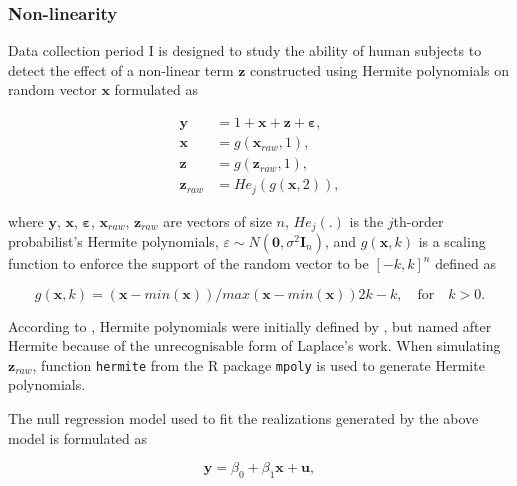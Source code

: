 \documentclass[]{interact}
\theoremstyle{plain}%
\theoremstyle{definition}
\theoremstyle{remark}
\begin{document}
\hypertarget{non-linearity}{%
\subsubsection{Non-linearity}\label{non-linearity}}

Data collection period I is designed to study the ability of human
subjects to detect the effect of a non-linear term \(\boldsymbol{z}\)
constructed using Hermite polynomials on random vector
\(\boldsymbol{x}\) formulated as

\begin{align} \label{eq:nonlinearity-model}
\boldsymbol{y} &= 1 + \boldsymbol{x} + \boldsymbol{z} + \boldsymbol{\varepsilon},\\
\boldsymbol{x} &= g(\boldsymbol{x}_{raw}, 1), \\
\boldsymbol{z} &= g(\boldsymbol{z}_{raw}, 1), \\
\boldsymbol{z}_{raw} &= He_j(g(\boldsymbol{x}, 2)),
\end{align}

\noindent where \(\boldsymbol{y}\), \(\boldsymbol{x}\),
\(\boldsymbol{\varepsilon}\), \(\boldsymbol{x}_{raw}\),
\(\boldsymbol{z}_{raw}\) are vectors of size \(n\), \(He_{j}(.)\) is the
\(j\)th-order probabilist's Hermite polynomials,
\(\varepsilon \sim N(\boldsymbol{0}, \sigma^2\boldsymbol{I}_n)\), and
\(g(\boldsymbol{x}, k)\) is a scaling function to enforce the support of
the random vector to be \([-k, k]^n\) defined as

\begin{equation} \label{eq:scaling-function}
g(\boldsymbol{x}, k) = (\boldsymbol{x} - min(\boldsymbol{x}))/max(\boldsymbol{x} - min(\boldsymbol{x}))2k - k, \quad \text{for} \quad k > 0. 
\end{equation}

According to \citet{abramowitz1964handbook}, Hermite polynomials were
initially defined by \citet{de1820theorie}, but named after Hermite
\citep{hermite1864nouveau} because of the unrecognisable form of
Laplace's work. When simulating \(\boldsymbol{z}_{raw}\), function
\texttt{hermite} from the R package \texttt{mpoly} \citep{mpoly} is used
to generate Hermite polynomials.

The null regression model used to fit the realizations generated by the
above model is formulated as

\begin{equation} \label{eq:null-model}
\boldsymbol{y} = \beta_0 + \beta_1 \boldsymbol{x} + \boldsymbol{u},
\end{equation}
\end{document}
